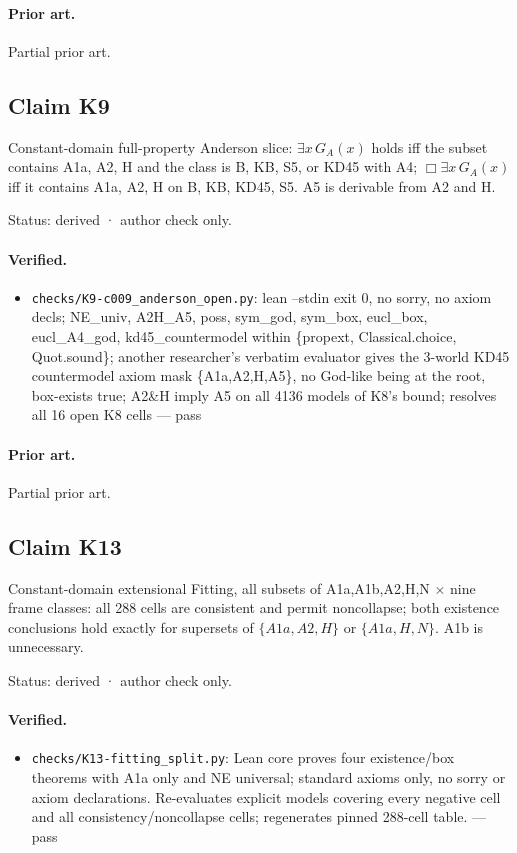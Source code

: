 \documentclass{article}
\begin{document}
\paragraph{Prior art.} Partial prior art.

\subsection*{Claim K9}

Constant-domain full-property Anderson slice: $\exists x\,G_A(x)$ holds iff the subset contains A1a, A2, H and the class is B, KB, S5, or KD45 with A4; $\Box\exists x\,G_A(x)$ iff it contains A1a, A2, H on B, KB, KD45, S5. A5 is derivable from A2 and H.

Status: derived · author check only.

\paragraph{Verified.}
\begin{itemize}
\item \texttt{checks/K9-c009\_anderson\_open.py}: lean --stdin exit 0, no sorry, no axiom decls; NE\_univ, A2H\_A5, poss, sym\_god, sym\_box, eucl\_box, eucl\_A4\_god, kd45\_countermodel within \{propext, Classical.choice, Quot.sound\}; another researcher's verbatim evaluator gives the 3-world KD45 countermodel axiom mask \{A1a,A2,H,A5\}, no God-like being at the root, box-exists true; A2\&H imply A5 on all 4136 models of K8's bound; resolves all 16 open K8 cells --- pass
\end{itemize}

\paragraph{Prior art.} Partial prior art.

\subsection*{Claim K13}

Constant-domain extensional Fitting, all subsets of A1a,A1b,A2,H,N $\times$ nine frame classes: all 288 cells are consistent and permit noncollapse; both existence conclusions hold exactly for supersets of $\{A1a,A2,H\}$ or $\{A1a,H,N\}$. A1b is unnecessary.

Status: derived · author check only.

\paragraph{Verified.}
\begin{itemize}
\item \texttt{checks/K13-fitting\_split.py}: Lean core proves four existence/box theorems with A1a only and NE universal; standard axioms only, no sorry or axiom declarations. Re-evaluates explicit models covering every negative cell and all consistency/noncollapse cells; regenerates pinned 288-cell table. --- pass
\end{itemize}
\end{document}
